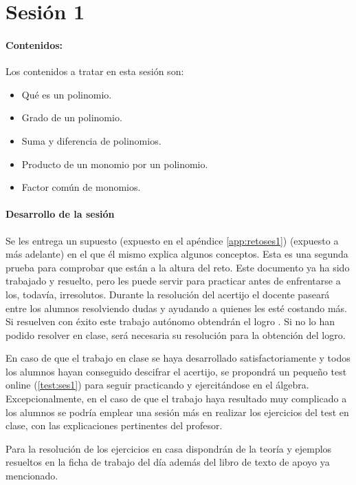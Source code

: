 \section{Sesión 1}


\paragraph{Contenidos:}
Los contenidos a tratar en esta sesión son:
\begin{itemize}
\item Qué es un polinomio.
\item Grado de un polinomio.
\item Suma y diferencia de polinomios.
\item Producto de un monomio por un polinomio.
\item Factor común de monomios.
\end{itemize}


\paragraph{Desarrollo de la sesión} 

Se les entrega un supuesto  
%
\ifinapp
	(expuesto en el apéndice \ref{app:retoses1})
\else 
	(expuesto a más adelante)
\fi 
%
en el que él mismo explica algunos conceptos.
%
Esta es una segunda prueba para comprobar que están a la altura del reto.
%
Este documento ya ha sido trabajado y resuelto, pero les puede servir para practicar antes de enfrentarse a los, todavía, irresolutos.
%
Durante la resolución del acertijo el docente paseará entre los alumnos resolviendo dudas y ayudando a quienes les esté costando más. 
%
Si resuelven con éxito este trabajo autónomo obtendrán el logro .
%
Si no lo han podido resolver en clase, será necesaria su resolución para la obtención del logro.

En caso de que el trabajo en clase se haya desarrollado satisfactoriamente y todos los alumnos hayan conseguido descifrar el acertijo, se propondrá un pequeño test online (\ref{test:ses1}) para seguir practicando y ejercitándose en el álgebra.
%
Excepcionalmente, en el caso de que el trabajo haya resultado muy complicado a los alumnos se podría emplear una sesión más en realizar los ejercicios del test en clase, con las explicaciones pertinentes del profesor.

Para la resolución de los ejercicios en casa dispondrán de la teoría y ejemplos resueltos en la ficha de trabajo del día además del libro de texto de apoyo ya mencionado.

